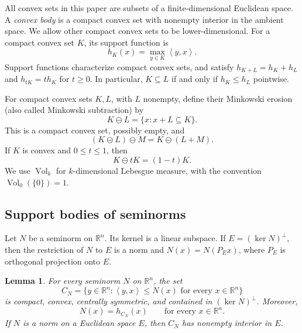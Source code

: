\documentclass[11pt]{article}
\newtheorem{lemma}[theorem]{Lemma}
\theoremstyle{remark}
\newcommand{\R}{\mathbb{R}}
\newcommand{\Vol}{\operatorname{Vol}}
\newcommand{\ip}[2]{\left\langle #1,#2\right\rangle}
\newcommand{\MinkDiff}{\mathbin{\ominus}}
\begin{document}
All convex sets in this paper are subsets of a finite-dimensional
Euclidean space.  A \emph{convex body} is a compact convex set with
nonempty interior in the ambient space.  We allow other compact convex
sets to be lower-dimensional.  For a compact convex set $K$, its
support function is
\[
  h_K(x)=\max_{y\in K}\ip{y}{x}.
\]
Support functions characterize compact convex sets, and satisfy
$h_{K+L}=h_K+h_L$ and $h_{tK}=t h_K$ for $t\geq0$.  In particular,
$K\subseteq L$ if and only if $h_K\leq h_L$ pointwise.

For compact convex sets $K,L$, with $L$ nonempty, define their
Minkowski erosion (also called Minkowski subtraction) by
\[
  K\MinkDiff L=\{x:x+L\subseteq K\}.
\]
This is a compact convex set, possibly empty, and
\begin{equation}\label{eq:erosion-associative}
  (K\MinkDiff L)\MinkDiff M=K\MinkDiff(L+M).
\end{equation}
If $K$ is convex and $0\leq t\leq1$, then
\begin{equation}\label{eq:self-erosion}
  K\MinkDiff tK=(1-t)K.
\end{equation}
We use $\Vol_k$ for $k$-dimensional Lebesgue measure, with the
convention $\Vol_0(\{0\})=1$.

\subsection{Support bodies of seminorms}

Let $N$ be a seminorm on $\R^n$.  Its kernel is a linear subspace.  If
$E=(\ker N)^\perp$, then the restriction of $N$ to $E$ is a norm and
$N(x)=N(P_Ex)$, where $P_E$ is orthogonal projection onto $E$.

\begin{lemma}\label{lem:support-body}
For every seminorm $N$ on $\R^n$, the set
\[
  C_N=\{y\in\R^n:\ip{y}{x}\leq N(x)\text{ for every }x\in\R^n\}
\]
is compact, convex, centrally symmetric, and contained in
$(\ker N)^\perp$.  Moreover,
\[
  N(x)=h_{C_N}(x)\qquad\text{for every }x\in\R^n.
\]
If $N$ is a norm on a Euclidean space $E$, then $C_N$ has nonempty
interior in $E$.
\end{lemma}
\end{document}

